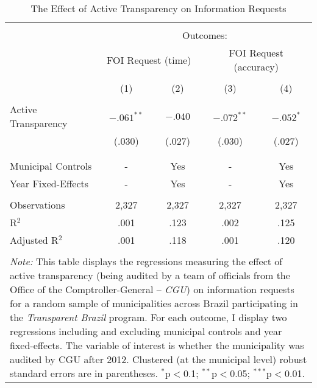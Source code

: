 
\begin{table}[!htbp] \centering
  \caption{The Effect of Active Transparency on Information Requests}
  \label{tab:transparency2}
\scriptsize
\begin{tabular}{@{\extracolsep{5pt}}lcccc}
\\[-1.8ex]\hline
\hline \\[-1.8ex]
& \multicolumn{4}{c}{Outcomes:} \T \B \\
\cline{2-5}
 & \multicolumn{2}{c}{FOI Request (time)} & \multicolumn{2}{c}{FOI Request (accuracy)} \T \B \\
\\[-1.8ex] & \multicolumn{1}{c}{(1)} & \multicolumn{1}{c}{(2)} & \multicolumn{1}{c}{(3)} & \multicolumn{1}{c}{(4)} \B \\
\hline \\[-1.8ex]
Active Transparency & $-.061^{**}$ & $-.040$ & $-.072^{**}$ & $-.052^{*}$ \\
                    & (.030) & (.027) & (.030) & (.027) \\
                    & & & & \\
\hline \\[-1.8ex]
Municipal Controls & \multicolumn{1}{c}{-} & \multicolumn{1}{c}{Yes} & \multicolumn{1}{c}{-} & \multicolumn{1}{c}{Yes} \\
Year Fixed-Effects & \multicolumn{1}{c}{-} & \multicolumn{1}{c}{Yes} & \multicolumn{1}{c}{-} & \multicolumn{1}{c}{Yes} \\
\hline \\[-1.8ex]
Observations & \multicolumn{1}{c}{2,327} & \multicolumn{1}{c}{2,327} & \multicolumn{1}{c}{2,327} & \multicolumn{1}{c}{2,327} \\
R$^{2}$ & \multicolumn{1}{c}{.001} & \multicolumn{1}{c}{.123} & \multicolumn{1}{c}{.002} & \multicolumn{1}{c}{.125} \\
Adjusted R$^{2}$ & \multicolumn{1}{c}{.001} & \multicolumn{1}{c}{.118} & \multicolumn{1}{c}{.001} & \multicolumn{1}{c}{.120} \\
\hline
\hline \\[-1.8ex]
\multicolumn{5}{p{.6\textwidth}}{\emph{Note:} This table displays the regressions measuring the effect of active transparency (being audited by a team of officials from the Office of the Comptroller-General -- \emph{CGU}) on information requests for a random sample of municipalities across Brazil participating in the \emph{Transparent Brazil} program. For each outcome, I display two regressions including and excluding municipal controls and year fixed-effects. The variable of interest is whether the municipality was audited by CGU after 2012. Clustered (at the municipal level) robust standard errors are in parentheses. $^{*}$p$<$0.1; $^{**}$p$<$0.05; $^{***}$p$<$0.01.}\\
\end{tabular}
\end{table}
